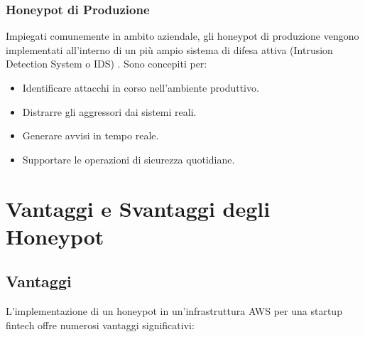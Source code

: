 \subsubsection{Honeypot di Produzione}
\label{subsubsec:produzione}

Impiegati comunemente in ambito aziendale, gli honeypot di produzione vengono implementati all'interno di un più ampio sistema di difesa attiva (Intrusion Detection System o IDS) \cite{proofpoint2024}. Sono concepiti per:
\begin{itemize}
    \item Identificare attacchi in corso nell'ambiente produttivo.
    \item Distrarre gli aggressori dai sistemi reali.
    \item Generare avvisi in tempo reale.
    \item Supportare le operazioni di sicurezza quotidiane.
\end{itemize}

\section{Vantaggi e Svantaggi degli Honeypot}
\label{sec:vantaggi_svantaggi}

\subsection{Vantaggi}
\label{subsec:vantaggi}

L'implementazione di un honeypot in un'infrastruttura AWS per una startup fintech offre numerosi vantaggi significativi:

